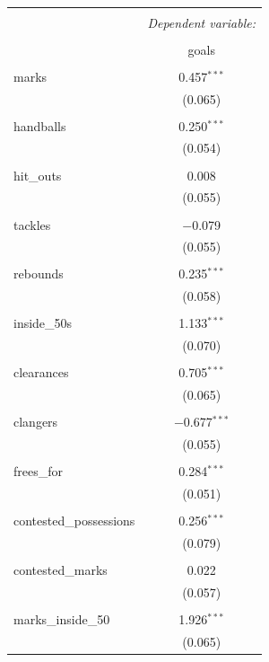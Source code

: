 \documentclass{article}
\begin{document}
\begin{table}[!htbp] \centering 
  \caption{} 
  \label{} 
\begin{tabular}{@{\extracolsep{5pt}}lc} 
\\[-1.8ex]\hline 
\hline \\[-1.8ex] 
 & \multicolumn{1}{c}{\textit{Dependent variable:}} \\ 
\cline{2-2} 
\\[-1.8ex] & goals \\ 
\hline \\[-1.8ex] 
 marks & 0.457$^{***}$ \\ 
  & (0.065) \\ 
  & \\ 
 handballs & 0.250$^{***}$ \\ 
  & (0.054) \\ 
  & \\ 
 hit\_outs & 0.008 \\ 
  & (0.055) \\ 
  & \\ 
 tackles & $-$0.079 \\ 
  & (0.055) \\ 
  & \\ 
 rebounds & 0.235$^{***}$ \\ 
  & (0.058) \\ 
  & \\ 
 inside\_50s & 1.133$^{***}$ \\ 
  & (0.070) \\ 
  & \\ 
 clearances & 0.705$^{***}$ \\ 
  & (0.065) \\ 
  & \\ 
 clangers & $-$0.677$^{***}$ \\ 
  & (0.055) \\ 
  & \\ 
 frees\_for & 0.284$^{***}$ \\ 
  & (0.051) \\ 
  & \\ 
 contested\_possessions & 0.256$^{***}$ \\ 
  & (0.079) \\ 
  & \\ 
 contested\_marks & 0.022 \\ 
  & (0.057) \\ 
  & \\ 
 marks\_inside\_50 & 1.926$^{***}$ \\ 
  & (0.065) \\ 

\end{tabular}
\end{table}
\end{document}
